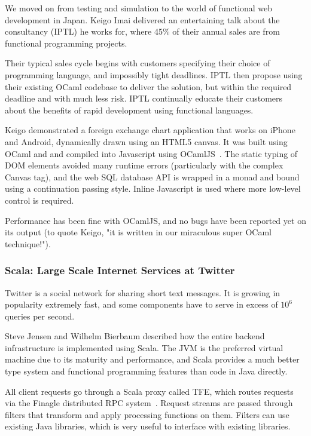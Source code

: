 \documentclass{jfp1}
\begin{document}
We moved on from testing and simulation to the world of functional web
development in Japan. Keigo Imai delivered an entertaining talk about the
consultancy (IPTL) he works for, where 45\% of their annual sales are from
functional programming projects.

Their typical sales cycle begins with customers specifying their choice of
programming language, and impossibly tight deadlines. IPTL then propose using
their existing OCaml codebase to deliver the solution, but within the required
deadline and with much less risk. IPTL continually educate their customers
about the benefits of rapid development using functional languages.

Keigo demonstrated a foreign exchange chart application that works on iPhone
and Android, dynamically drawn using an HTML5 canvas. It was built using OCaml
and and compiled into Javascript using OCamlJS~\cite{x}. The static typing of
DOM elements avoided many runtime errors (particularly with the complex Canvas
tag), and the web SQL database API is wrapped in a monad and bound using a
continuation passing style. Inline Javascript is used where more low-level
control is required.

Performance has been fine with OCamlJS, and no bugs have been reported yet on
its output (to quote Keigo, "it is written in our miraculous super OCaml
technique!").

\subsubsection{Scala: Large Scale Internet Services at Twitter}

Twitter is a social network for sharing short text messages. It is growing in
popularity extremely fast, and some components have to serve in excess of
$10^6$ queries per second.

Steve Jensen and Wilhelm Bierbaum described how the entire backend
infrastructure is implemented using Scala.  The JVM is the preferred virtual
machine due to its maturity and performance, and Scala provides a much better
type system and functional programming features than code in Java directly.

All client requests go through a Scala proxy called TFE, which routes requests
via the Finagle distributed RPC system~\cite{f}. Request streams are passed
through filters that transform and apply processing functions on them.  Filters
can use existing Java libraries, which is very useful to interface with
existing libraries. 
\end{document}
